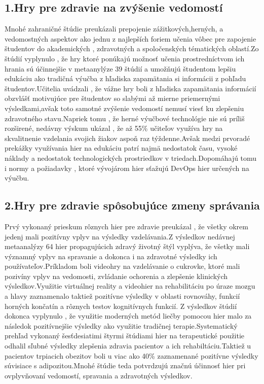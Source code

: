 \documentclass[10pt,oneside,slovak,a4paper]{article}
\begin{document}
\subsection{1.Hry pre zdravie na zvýšenie vedomostí}
Mnohé zahraničné štúdie preukázali prepojenie zážitkových,herných, a vedomostných aspektov ako jednu z najlepších foriem učenia vôbec pre zapojenie študentov do akademických , zdravotných a spoločenských tématických oblastí.Zo štúdií vyplynulo , že hry ktoré ponúkajú možnosť učenia prostredníctvom ich hrania sú účinnejšie v metaanylýze 39 štúdií a umožňujú študentom lepšiu edukáciu ako tradičná výučba z hľadiska zapamätania si informácii z pohľadu študentov.Učitelia uvádzali , že vážne hry boli z hľadiska zapamätania informácií obzvlášť motivujúce pre študentov so slabými až mierne priemernými výsledkami,avšak toto samotné zvýšenie vedomostí nemusí viesť ku zlepšeniu zdravotného stavu.Napriek tomu , že herné výučbové technológie nie sú príliš rozširené, nedávny výskum ukázal , že až 55\% učiteľov využíva hry na skvalitnenie vzdelania svojich žiakov aspoň raz týždenne.Avšak medzi prvoradé prekážky využívania hier na edukáciu patrí najmä nedostatok času, vysoké náklady a nedostatok technologických prostriedkov v triedach.Dopomáhajú tomu i normy a požiadavky , ktoré vývojárom hier sťažujú DevOps hier určených na výučbu.

\subsection{2.Hry pre zdravie spôsobujúce zmeny správania}
Prvý vykonaný prieskum rôznych hier pre zdravie preukázal , že všetky okrem jedenj mali pozitívny vplyv na výsledky vzdelávania.Z výsledkov nedávnej metaanalýzy 64 hier propagujúcich zdravý životný štýl vyplýva, že všetky mali významný vplyv na spravanie a dokonca i na zdravotné výsledky ich používateľov.Príkladom boli videohry na vzdelávanie o cukrovke, ktoré mali pozivíny vplyv na vedomosti, zvládanie ochorenia a zlepšenie klinických výsledkov.Využitie virtuálnej reality a videohier na rehabilitáciu po úraze mozgu a hlavy zaznamenalo taktiež pozitívne výsledky v oblasti rovnováhy, funkcií horných končatín a rôznych testov kognitívnych funkcií. Z výsledkov štúdií dokonca vyplynulo , že využitie moderných metód liečby pomocou hier malo za následok  pozitívnejšie výsledky ako využitie tradičnej terapie.Systematický prehľad vykonaný šesťdesiatimi štyrmi štúdiami hier na terapeutické použitie odhalil sľubné výsledky zlepšenia zdravia pacientov a ich rehabiltáciu.Taktiež u pacientov trpiacich obezitov boli u viac ako 40\% zaznamenané pozitívne výsledky súvisiace s adipozitou.Mnohé štúdie teda potvrdzujú značnú účinnosť hier pri ovplyvňovaní vedomostí, spravania a zdravotných výsledkov.
\end{document}
